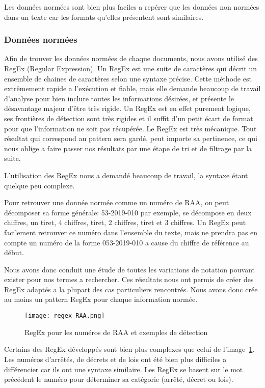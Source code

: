 Les données normées sont bien plus faciles a repérer que les données non normées dans un texte car les formats qu'elles présentent sont similaires.

\subsubsection{Données normées}
Afin de trouver les données normées de chaque documents, nous avons utilisé des RegEx (Regular Expression).
Un RegEx est une suite de caractères qui décrit un ensemble de chaines de caractères selon une syntaxe précise.
Cette méthode est extrêmement rapide a l'exécution et fiable, mais elle demande beaucoup de travail d'analyse pour bien inclure toutes les informations désirées, et présente le désavantage majeur d'être très rigide.
Un RegEx est en effet purement logique, ses frontières de détection sont très rigides et il suffit d'un petit écart de format pour que l'information ne soit pas récupérée.
Le RegEx est très mécanique.
Tout résultat qui correspond au pattern sera gardé, peut importe sa pertinence, ce qui nous oblige a faire passer nos résultats par une étape de tri et de filtrage par la suite.

L'utilisation des RegEx nous a demandé beaucoup de travail, la syntaxe étant quelque peu complexe.

Pour retrouver une donnée normée comme un numéro de RAA, on peut décomposer sa forme générale: 53-2019-010 par exemple, se décompose en deux chiffres, un tiret, 4 chiffres, tiret, 2 chiffres, tiret et 3 chiffres.
Un RegEx peut facilement retrouver ce numéro dans l'ensemble du texte, mais ne prendra pas en compte un numéro de la forme 053-2019-010 a cause du chiffre de référence au début.

Nous avons donc conduit une étude de toutes les variations de notation pouvant exister pour nos termes a rechercher.
Ces résultats nous ont permis de créer des RegEx adaptés a la plupart des cas particuliers rencontrés.
Nous avons donc crée au moins un pattern RegEx pour chaque information normée.

\begin{figure}[h!]
  \centering
  \texttt{[image: regex\_RAA.png]}
	\caption[]{RegEx pour les numéros de RAA et exemples de détection}
	\label{fig:regexRAA}
\end{figure}

Certains des RegEx développés sont bien plus complexes que celui de l'image~\ref{fig:regexRAA}.
Les numéros d'arrêtés, de décrets et de lois ont été bien plus difficiles a différencier car ils ont une syntaxe similaire.
Les RegEx se basent sur le mot précédent le numéro pour déterminer sa catégorie (arrêté, décret ou lois).


